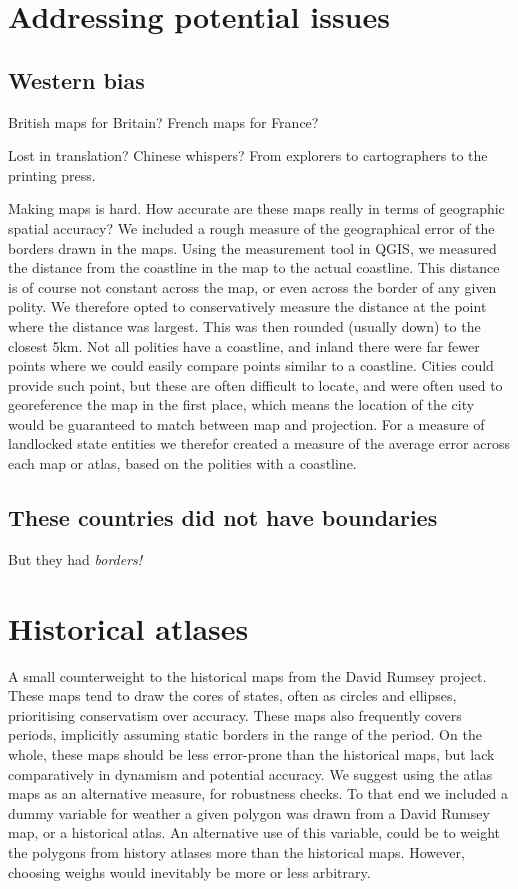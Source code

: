 \documentclass[12pt]{article}
\begin{document}
\section{Addressing potential issues}
\subsection{Western bias}
British maps for Britain?
French maps for France?

Lost in translation? 
Chinese whispers?
From explorers to cartographers to the printing press.

Making maps is hard.
How accurate are these maps really in terms of geographic spatial accuracy?
We included a rough measure of the geographical error of the borders drawn in the maps.
Using the measurement tool in QGIS, we measured the distance from the coastline in the map to the actual coastline.
This distance is of course not constant across the map, or even across the border of any given polity. 
We therefore opted to conservatively measure the distance at the point where the distance was largest.
This was then rounded (usually down) to the closest 5km.
Not all polities have a coastline, and inland there were far fewer points where we could easily compare points similar to a coastline.
Cities could provide such point, but these are often difficult to locate, and were often used to georeference the map in the first place, which means the location of the city would be guaranteed to match between map and projection.
For a measure of landlocked state entities we therefor created a measure of the average error across each map or atlas, based on the polities with a coastline.


\subsection{These countries did not have boundaries}
But they had \emph{borders!}

\section{Historical atlases}
A small counterweight to the historical maps from the David Rumsey project.
These maps tend to draw the cores of states, often as circles and ellipses, prioritising conservatism over accuracy.
These maps also frequently covers periods, implicitly assuming static borders in the range of the period.
On the whole, these maps should be less error-prone than the historical maps, but lack comparatively in dynamism and potential accuracy.
We suggest using the atlas maps as an alternative measure, for robustness checks. 
To that end we included a dummy variable for weather a given polygon was drawn from a David Rumsey map, or a historical atlas.
An alternative use of this variable, could be to weight the polygons from history atlases more than the historical maps.
However, choosing weighs would inevitably be more or less arbitrary.
\end{document}
